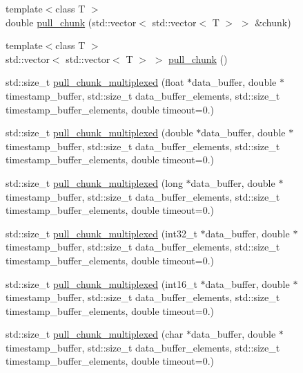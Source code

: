 \begin{DoxyCompactItemize}
\item 
{\footnotesize template$<$class T $>$ }\\double \hyperlink{classlsl_1_1stream__inlet_acf6cdc3afdbb4c31c97fb979e4aca632}{pull\+\_\+chunk} (std\+::vector$<$ std\+::vector$<$ T $>$ $>$ \&chunk)
\item 
{\footnotesize template$<$class T $>$ }\\std\+::vector$<$ std\+::vector$<$ T $>$ $>$ \hyperlink{classlsl_1_1stream__inlet_a558f53812f5dc3c19b2cbe0026a61f6a}{pull\+\_\+chunk} ()
\item 
std\+::size\+\_\+t \hyperlink{classlsl_1_1stream__inlet_a97adf2cb7d60e4b47bf25217a2b17964}{pull\+\_\+chunk\+\_\+multiplexed} (float $\ast$data\+\_\+buffer, double $\ast$timestamp\+\_\+buffer, std\+::size\+\_\+t data\+\_\+buffer\+\_\+elements, std\+::size\+\_\+t timestamp\+\_\+buffer\+\_\+elements, double timeout=0.)
\item 
std\+::size\+\_\+t \hyperlink{classlsl_1_1stream__inlet_abdb890fbad785ed4bc39288fc2f47329}{pull\+\_\+chunk\+\_\+multiplexed} (double $\ast$data\+\_\+buffer, double $\ast$timestamp\+\_\+buffer, std\+::size\+\_\+t data\+\_\+buffer\+\_\+elements, std\+::size\+\_\+t timestamp\+\_\+buffer\+\_\+elements, double timeout=0.)
\item 
std\+::size\+\_\+t \hyperlink{classlsl_1_1stream__inlet_aa2f2c576a6b5a3bf562878200829bb47}{pull\+\_\+chunk\+\_\+multiplexed} (long $\ast$data\+\_\+buffer, double $\ast$timestamp\+\_\+buffer, std\+::size\+\_\+t data\+\_\+buffer\+\_\+elements, std\+::size\+\_\+t timestamp\+\_\+buffer\+\_\+elements, double timeout=0.)
\item 
std\+::size\+\_\+t \hyperlink{classlsl_1_1stream__inlet_a3b93d803b348905bc34747c5820d6364}{pull\+\_\+chunk\+\_\+multiplexed} (int32\+\_\+t $\ast$data\+\_\+buffer, double $\ast$timestamp\+\_\+buffer, std\+::size\+\_\+t data\+\_\+buffer\+\_\+elements, std\+::size\+\_\+t timestamp\+\_\+buffer\+\_\+elements, double timeout=0.)
\item 
std\+::size\+\_\+t \hyperlink{classlsl_1_1stream__inlet_a40e9727b155e274df482e4579e60f3b3}{pull\+\_\+chunk\+\_\+multiplexed} (int16\+\_\+t $\ast$data\+\_\+buffer, double $\ast$timestamp\+\_\+buffer, std\+::size\+\_\+t data\+\_\+buffer\+\_\+elements, std\+::size\+\_\+t timestamp\+\_\+buffer\+\_\+elements, double timeout=0.)
\item 
std\+::size\+\_\+t \hyperlink{classlsl_1_1stream__inlet_a85ee4c75121e8ee54de22f228a3abae5}{pull\+\_\+chunk\+\_\+multiplexed} (char $\ast$data\+\_\+buffer, double $\ast$timestamp\+\_\+buffer, std\+::size\+\_\+t data\+\_\+buffer\+\_\+elements, std\+::size\+\_\+t timestamp\+\_\+buffer\+\_\+elements, double timeout=0.)

\end{DoxyCompactItemize}
